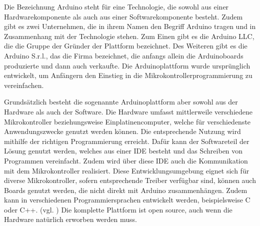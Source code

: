 Die Bezeichnung Arduino steht für eine Technologie, die sowohl aus einer Hardwarekomponente als auch aus einer Softwarekomponente besteht. Zudem gibt es zwei Unternehmen, die in ihrem Namen den Begriff Arduino tragen und in Zusammenhang mit der Technologie stehen. Zum Einen gibt es die Arduino LLC, die die Gruppe der Gründer der Plattform bezeichnet. Des Weiteren gibt es die Arduino S.r.l., das die Firma bezeichnet, die anfangs allein die Arduinoboards produzierte und dann auch verkaufte. Die Arduinoplattform wurde ursprünglich entwickelt, um Anfängern den Einstieg in die Mikrokontrollerprogrammierung zu vereinfachen. 

Grundsätzlich besteht die sogenannte Arduinoplattform aber sowohl aus der Hardware als auch der Software. Die Hardware umfasst mittlerweile verschiedene Mikrokontroller beziehungsweise Einplatinencomputer, welche für verschiedenste Anwendungszwecke genutzt werden können. Die entsprechende Nutzung wird mithilfe der richtigen Programmierung erreicht. Dafür kann der Softwareteil der Lösung genutzt werden, welches aus einer \ac{IDE} besteht und das Schreiben von Programmen vereinfacht. Zudem wird über diese \ac{IDE} auch die Kommunikation mit dem Mikrokontroller realisiert. Diese Entwicklungsumgebung eignet sich für diverse Mikrokontroller, sofern entsprechende Treiber verfügbar sind, können auch Boards genutzt werden, die nicht direkt mit Arduino zusammenhängen. Zudem kann in verschiedenen Programmiersprachen entwickelt werden, beispielsweise C oder C++. (vgl. \cite{.h,.f,.e,.i,.g,online.})
Die komplette Plattform ist open source, auch wenn die Hardware natürlich erworben werden muss. 

